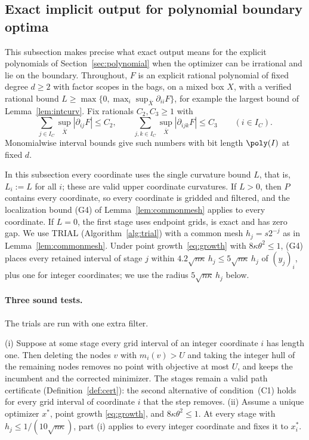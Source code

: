 \subsection{Exact implicit output for polynomial boundary optima}\label{app:boundary}

This subsection makes precise what exact output means for the explicit
polynomials of Section~\ref{sec:polynomial} when the optimizer can be
irrational and lie on the boundary. Throughout, $F$ is an explicit rational
polynomial of fixed degree $d\ge2$ with factor scopes in the bags, on a mixed
box $X$, with a verified rational bound
$L\ge\max\{0,\max_i\sup_{\bar X}\partial_{ii}F\}$,
for example the largest bound of Lemma~\ref{lem:intcurv}. Fix rationals
$C_2,C_3\ge1$ with
\[
\sum_{j\in I_C}\sup_{\bar X}|\partial_{ij}F|\le C_2,\qquad
\sum_{j,k\in I_C}\sup_{\bar X}|\partial_{ijk}F|\le C_3
\qquad(i\in I_C).
\]
Monomialwise interval bounds give such numbers with bit length $\poly(I)$
at fixed $d$.

In this subsection every coordinate uses the single curvature bound $L$, that
is, $L_i:=L$ for all $i$; these are valid upper coordinate curvatures. If
$L>0$, then $P$ contains every coordinate, so every coordinate is gridded and
filtered, and the localization bound (G4) of Lemma~\ref{lem:commonmesh}
applies to every coordinate. If $L=0$, the first stage uses endpoint grids,
is exact and has zero gap. We use TRIAL (Algorithm~\ref{alg:trial}) with a
common mesh $h_j=s2^{-j}$ as in Lemma~\ref{lem:commonmesh}. Under point
growth~\eqref{eq:growth} with $8\kappa\theta^2\le1$, (G4) places every
retained interval of stage $j$ within
$4.2\sqrt{n\kappa}\,h_j\le5\sqrt{n\kappa}\,h_j$ of $(y_j)_i$, plus one for
integer coordinates; we use the radius $5\sqrt{n\kappa}\,h_j$ below.

\paragraph{Three sound tests.}
The trials are run with one extra filter.

\begin{lemma}\label{lem:labelfilter}
(i) Suppose at some stage every grid interval of an integer coordinate $i$
has length one. Then deleting the nodes $v$ with $m_i(v)>U$ and taking the
integer hull of the remaining nodes removes no point with objective at most
$U$, and keeps the incumbent and the corrected minimizer. The stages remain a
valid path certificate (Definition~\ref{def:cert}): the second alternative of
condition~(C1) holds for every grid interval of coordinate $i$ that the step
removes.
(ii) Assume a unique optimizer $x^*$, point growth \eqref{eq:growth}, and
$8\kappa\theta^2\le1$. At every stage with $h_j\le1/(10\sqrt{n\kappa})$,
part (i) applies to every integer coordinate and fixes it to $x^*_i$.
\end{lemma}

